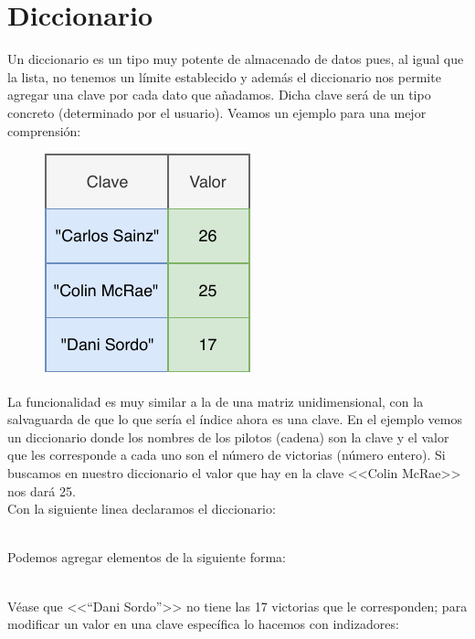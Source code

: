 \documentclass[11pt, oneside]{book}		%
\begin{document}
	\section{Diccionario}
	Un diccionario\cite{msdn:diccionario} es un tipo muy potente de almacenado de datos pues, al igual que la lista, no tenemos un límite establecido y además el diccionario nos permite agregar una clave por cada dato que añadamos. Dicha clave será de un tipo concreto (determinado por el usuario). Veamos un ejemplo para una mejor comprensión:
	\begin{figure}[H]
		\centering
		\includegraphics{img/TiposEnumerables/Diccionario/diccionario1.pdf}
	\end{figure} 
	La funcionalidad es muy similar a la de una matriz unidimensional, con la salvaguarda de que lo que sería el índice ahora es una clave. En el ejemplo vemos un diccionario donde los nombres de los pilotos (cadena) son la clave y el valor que les corresponde a cada uno son el número de victorias (número entero). Si buscamos en nuestro diccionario el valor que hay en la clave <<Colin McRae>> nos dará 25.\\
	Con la siguiente linea declaramos el diccionario:
	\\\\\begin{minipage}[c]{0.95\textwidth}
		
	\end{minipage}
	Podemos agregar elementos de la siguiente forma:
	\\\\\begin{minipage}[c]{0.95\textwidth}
		
	\end{minipage}	
	Véase que <<``Dani Sordo''>> no tiene las 17 victorias que le corresponden; para modificar un valor en una clave específica lo hacemos con indizadores:
	\\\\\begin{minipage}[c]{0.95\textwidth}
		
	\end{minipage}	
\end{document}
